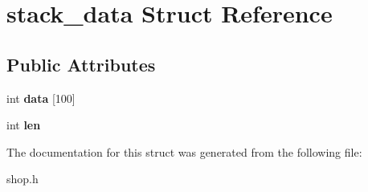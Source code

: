 \hypertarget{structstack__data}{}\section{stack\+\_\+data Struct Reference}
\label{structstack__data}
\subsection*{Public Attributes}
\begin{DoxyCompactItemize}
\item 
\mbox{\label{structstack__data_a7bf79f3cb507b4e30395065e4c60bef1}} 
int {\bfseries data} \mbox{[}100\mbox{]}
\item 
\mbox{\label{structstack__data_a2e73b74b1cfd81ee352deb1073b2c9a8}} 
int {\bfseries len}
\end{DoxyCompactItemize}


The documentation for this struct was generated from the following file\+:\begin{DoxyCompactItemize}
\item 
shop.\+h\end{DoxyCompactItemize}
